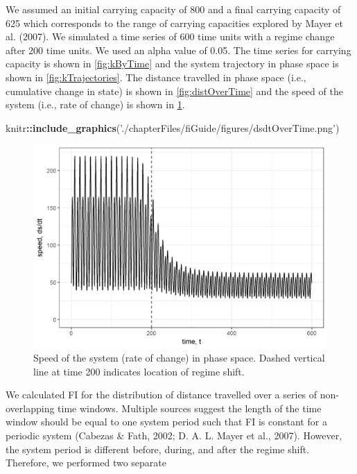 \documentclass[12pt,twoside,openany]{reedthesis}
\newenvironment{Shaded}{\begin{snugshade}}{\end{snugshade}}
\newcommand{\KeywordTok}[1]{\textcolor[rgb]{0.13,0.29,0.53}{\textbf{#1}}}
\newcommand{\StringTok}[1]{\textcolor[rgb]{0.31,0.60,0.02}{#1}}
\newcommand{\OperatorTok}[1]{\textcolor[rgb]{0.81,0.36,0.00}{\textbf{#1}}}
\newcommand{\NormalTok}[1]{#1}
\begin{document}
We assumed an initial carrying capacity of 800 and a final carrying
capacity of 625 which corresponds to the range of carrying capacities
explored by Mayer et al. (2007). We simulated a time series of 600 time
units with a regime change after 200 time units. We used an alpha value
of 0.05. The time series for carrying capacity is shown in
\ref{fig:kByTime} and the system trajectory in phase space is shown in
\ref{fig:kTrajectories}. The distance travelled in phase space (i.e.,
cumulative change in state) is shown in \ref{fig:distOverTime} and the
speed of the system (i.e., rate of change) is shown in
\ref{fig:dsdtOverTime}.
\begin{Shaded}
\begin{Highlighting}[]
\NormalTok{knitr}\OperatorTok{::}\KeywordTok{include_graphics}\NormalTok{(}\StringTok{'./chapterFiles/fiGuide/figures/dsdtOverTime.png'}\NormalTok{)}
\end{Highlighting}
\end{Shaded}
\begin{figure}
\includegraphics[width=27.08in]{./chapterFiles/fiGuide/figures/dsdtOverTime} \caption{Speed of the system (rate of change) in phase space. Dashed vertical line at time 200 indicates location of regime shift.}\label{fig:dsdtOverTime}
\end{figure}
We calculated FI for the distribution of distance travelled over a
series of non-overlapping time windows. Multiple sources suggest the
length of the time window should be equal to one system period such that
FI is constant for a periodic system (Cabezas \& Fath, 2002; D. A. L.
Mayer et al., 2007). However, the system period is different before,
during, and after the regime shift. Therefore, we performed two separate
\end{document}
